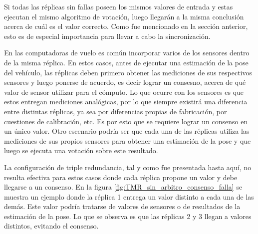Si todas las réplicas sin fallas poseen los mismos valores de entrada y estas ejecutan el mismo algoritmo de votación, luego llegarán a la misma conclusión acerca de cuál es el valor correcto. Como fue mencionado en la sección anterior, esto es de especial importancia para llevar a cabo la sincronización. 

En las computadoras de vuelo es común incorporar varios de los sensores dentro de la misma réplica. En estos casos, antes de ejecutar una estimación de la pose del vehículo, las réplicas deben primero obtener las mediciones de sus respectivos sensores y luego ponerse de acuerdo, es decir lograr un consesno, acerca de qué valor de sensor utilizar para el cómputo. Lo que ocurre con los sensores es que estos entregan mediciones analógicas, por lo que siempre existirá una diferencia entre distintas réplicas, ya sea por diferencias propias de fabricación, por cuestiones de calibración, etc. Es por esto que se requiere lograr un consenso en un único valor. Otro escenario podría ser que cada una de las réplicas utiliza las mediciones de sus propios sensores para obtener una estimación de la pose y que luego se ejecuta una votación sobre este resultado.

La configuración de triple redundancia, tal y como fue presentada hasta aquí, no resulta efectiva para estos casos donde cada réplica propone un valor y debe llegarse a un consenso. En la figura \ref{fig:TMR_sin_arbitro_consenso_falla} se muestra un ejemplo donde la réplica 1 entrega un valor distinto a cada una de las demás. Este valor podría tratarse de valores de sensores o de resultados de la estimación de la pose. Lo que se observa es que las réplicas 2 y 3 llegan a valores distintos, evitando el consenso.


